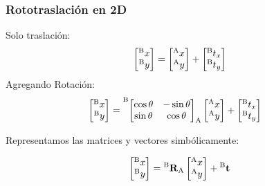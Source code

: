 \begin{frame}
    \frametitle{Rototraslación en 2D}
\scriptsize
Solo traslación:
    \begin{equation*}
        \begin{bmatrix}
            \toCoord{x}{B}\\
            \toCoord{y}{B}
        \end{bmatrix} =
        \begin{bmatrix}
            \toCoord{x}{A}\\
            \toCoord{y}{A}
        \end{bmatrix} +
        \begin{bmatrix}
            \toCoord{t_{x}}{B}\\
            \toCoord{t_{y}}{B}
        \end{bmatrix}
    \end{equation*}
Agregando Rotación:
    \begin{align*}
        \begin{bmatrix}
            \toCoord{x}{B}\\
            \toCoord{y}{B}
        \end{bmatrix} &=
       \toCoord{\fromCoord{\begin{bmatrix}
                                \cos \theta & -\sin \theta \\
                                \sin \theta & \cos \theta
                            \end{bmatrix}}{A}}{B}
        \begin{bmatrix}
            \toCoord{x}{A}\\
            \toCoord{y}{A}
        \end{bmatrix} +
        \begin{bmatrix}
            \toCoord{t_{x}}{B}\\
            \toCoord{t_{y}}{B}
        \end{bmatrix}
    \end{align*}

Representamos las matrices y vectores simbólicamente:

    \begin{equation*}
        \begin{bmatrix}
            \toCoord{x}{B}\\
            \toCoord{y}{B}\\
        \end{bmatrix} = \rotationCoord{B}{A}
        \begin{bmatrix}
            \toCoord{x}{A}\\
            \toCoord{y}{A}
        \end{bmatrix} + \toCoord{\translation}{B}
    \end{equation*}



\end{frame}
